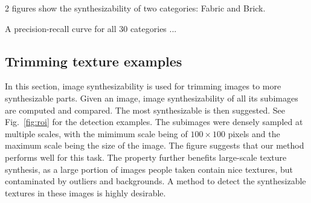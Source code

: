 2 figures show the synthesizability of two categories: Fabric and Brick. 

A precision-recall curve for all $30$ categories ...

\subsection{Trimming texture examples}
In this section, image synthesizability is used for trimming images to
more synthesizable parts. Given an image, image synthesizability of
all its subimages are computed and compared. The most synthesizable is
then suggested. See Fig.~\ref{fig:roi} for the detection examples. The
subimages were densely sampled at multiple scales, with the mimimum
scale being of $100 \times 100$ pixels and the maximum scale being the
size of the image. The figure suggests that our method performs well
for this task. The property further benefits large-scale texture
synthesis, as a large portion of images people taken contain nice
textures, but contaminated by outliers and backgrounds. A method to
detect the synthesizable textures in these images is highly desirable. 


